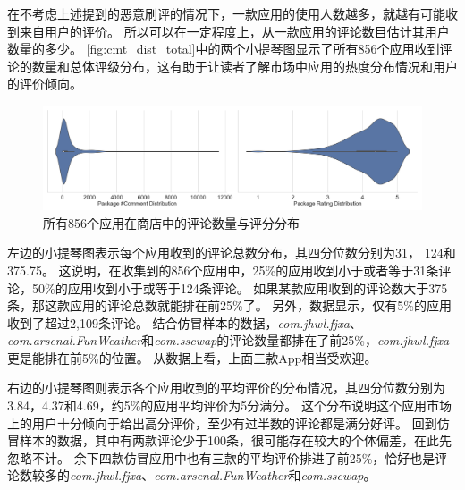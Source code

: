 在不考虑上述提到的恶意刷评的情况下，一款应用的使用人数越多，就越有可能收到来自用户的评价。
所以可以在一定程度上，从一款应用的评论数目估计其用户数量的多少。
\autoref{fig:cmt_dist_total}中的两个小提琴图显示了所有856个应用收到评论的数量和总体评级分布，这有助于让读者了解市场中应用的热度分布情况和用户的评价倾向。

%
%
%

\begin{figure}[htbp]
	\centering
	\includegraphics[width=\textwidth]{./Figures/edwin-360-comment-dist.png}
    \caption{所有856个应用在商店中的评论数量与评分分布}
    \label{fig:cmt_dist_total}
\end{figure}

左边的小提琴图表示每个应用收到的评论总数分布，其四分位数分别为31， 124和375.75。
这说明，在收集到的856个应用中，25\%的应用收到小于或者等于31条评论，50\%的应用收到小于或等于124条评论。
如果某款应用收到的评论数大于375条，那这款应用的评论总数就能排在前25\%了。
另外，数据显示，仅有5\%的应用收到了超过2,109条评论。
结合仿冒样本的数据，\emph{com.jhwl.fjxa}、\emph{com.arsenal.FunWeather}和\emph{com.sscwap}的评论数量都排在了前25\%，\emph{com.jhwl.fjxa}更是能排在前5\%的位置。
从数据上看，上面三款App相当受欢迎。

右边的小提琴图则表示各个应用收到的平均评价的分布情况，其四分位数分别为3.84，4.37和4.69，约5\%的应用平均评价为5分满分。
这个分布说明这个应用市场上的用户十分倾向于给出高分评价，至少有过半数的评论都是满分好评。
回到仿冒样本的数据，其中有两款评论少于100条，很可能存在较大的个体偏差，在此先忽略不计。
余下四款仿冒应用中也有三款的平均评价排进了前25\%，恰好也是评论数较多的\emph{com.jhwl.fjxa}、\emph{com.arsenal.FunWeather}和\emph{com.sscwap}。

